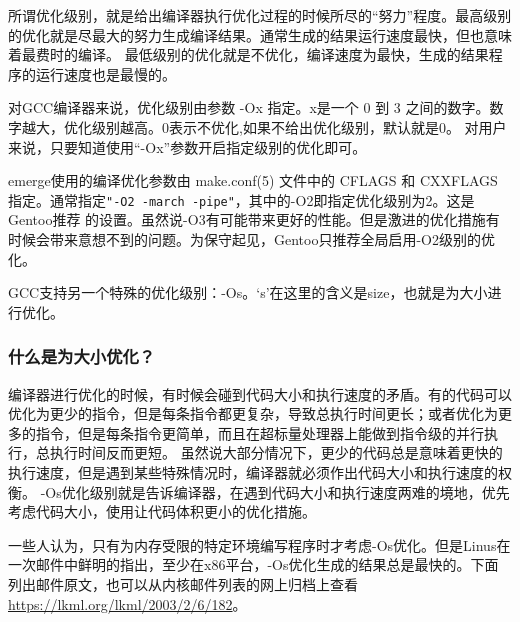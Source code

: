 所谓优化级别，就是给出编译器执行优化过程的时候所尽的“努力”程度。最高级别的优化就是尽最大的努力生成编译结果。通常生成的结果运行速度最快，但也意味着最费时的编译。
最低级别的优化就是不优化，编译速度为最快，生成的结果程序的运行速度也是最慢的。

对GCC编译器来说，优化级别由参数 -Ox 指定。x是一个  0 到 3 之间的数字。数字越大，优化级别越高。0表示不优化,如果不给出优化级别，默认就是0。
对用户来说，只要知道使用“-Ox”参数开启指定级别的优化即可。

emerge{}使用的编译优化参数由 make.conf(5) 文件中的{ }CFLAGS{ }和{ }CXXFLAGS{ }指定。通常指定\texttt{"-O2 -march -pipe"}，其中的-O2即指定优化级别为2。这是Gentoo推荐
的设置。虽然说-O3有可能带来更好的性能。但是激进的优化措施有时候会带来意想不到的问题。为保守起见，Gentoo只推荐全局启用-O2级别的优化。

GCC支持另一个特殊的优化级别：-Os。‘s’在这里的含义是size，也就是为大小进行优化。

\begin{insertnote}
\subsubsection{什么是为大小优化？}

编译器进行优化的时候，有时候会碰到代码大小和执行速度的矛盾。有的代码可以优化为更少的指令，但是每条指令都更复杂，导致总执行时间更长；或者优化为更多的指令，但是每条指令更简单，而且在超标量处理器上能做到指令级的并行执行，总执行时间反而更短。
虽然说大部分情况下，更少的代码总是意味着更快的执行速度，但是遇到某些特殊情况时，编译器就必须作出代码大小和执行速度的权衡。
-Os{}优化级别就是告诉编译器，在遇到代码大小和执行速度两难的境地，优先考虑代码大小，使用让代码体积更小的优化措施。

\end{insertnote}

一些人认为，只有为内存受限的特定环境编写程序时才考虑-Os优化。但是Linus在一次邮件中鲜明的指出，至少在x86平台，-Os优化生成的结果总是最快的。下面列出邮件原文，也可以从内核邮件列表的网上归档上查看 \url{https://lkml.org/lkml/2003/2/6/182}。

